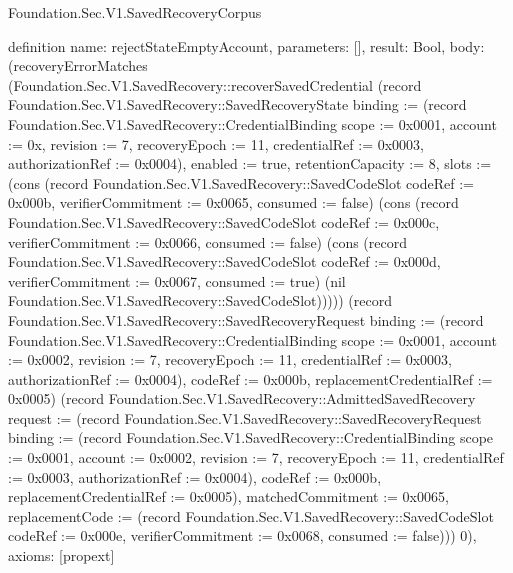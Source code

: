 \begin{lexlean}{Foundation.Sec.V1.SavedRecoveryCorpus}
\begin{semanticmodule}
definition{
  name: rejectStateEmptyAccount,
  parameters: [],
  result: Bool,
  body: (recoveryErrorMatches (Foundation.Sec.V1.SavedRecovery::recoverSavedCredential (record Foundation.Sec.V1.SavedRecovery::SavedRecoveryState {binding := (record Foundation.Sec.V1.SavedRecovery::CredentialBinding {scope := 0x0001, account := 0x, revision := 7, recoveryEpoch := 11, credentialRef := 0x0003, authorizationRef := 0x0004}), enabled := true, retentionCapacity := 8, slots := (cons (record Foundation.Sec.V1.SavedRecovery::SavedCodeSlot {codeRef := 0x000b, verifierCommitment := 0x0065, consumed := false}) (cons (record Foundation.Sec.V1.SavedRecovery::SavedCodeSlot {codeRef := 0x000c, verifierCommitment := 0x0066, consumed := false}) (cons (record Foundation.Sec.V1.SavedRecovery::SavedCodeSlot {codeRef := 0x000d, verifierCommitment := 0x0067, consumed := true}) (nil Foundation.Sec.V1.SavedRecovery::SavedCodeSlot))))}) (record Foundation.Sec.V1.SavedRecovery::SavedRecoveryRequest {binding := (record Foundation.Sec.V1.SavedRecovery::CredentialBinding {scope := 0x0001, account := 0x0002, revision := 7, recoveryEpoch := 11, credentialRef := 0x0003, authorizationRef := 0x0004}), codeRef := 0x000b, replacementCredentialRef := 0x0005}) (record Foundation.Sec.V1.SavedRecovery::AdmittedSavedRecovery {request := (record Foundation.Sec.V1.SavedRecovery::SavedRecoveryRequest {binding := (record Foundation.Sec.V1.SavedRecovery::CredentialBinding {scope := 0x0001, account := 0x0002, revision := 7, recoveryEpoch := 11, credentialRef := 0x0003, authorizationRef := 0x0004}), codeRef := 0x000b, replacementCredentialRef := 0x0005}), matchedCommitment := 0x0065, replacementCode := (record Foundation.Sec.V1.SavedRecovery::SavedCodeSlot {codeRef := 0x000e, verifierCommitment := 0x0068, consumed := false})})) 0),
  axioms: [propext]
}


\end{semanticmodule}
\end{lexlean}
